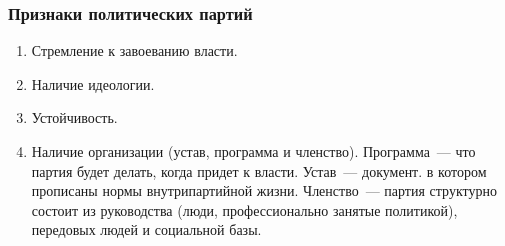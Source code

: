 \documentclass[12pt]{article}
\begin{document}
	\subsubsection{Признаки политических партий}
	\begin{enumerate}
		\item Стремление к завоеванию власти.
		\item Наличие идеологии.
		\item Устойчивость.
		\item Наличие организации (устав, программа и членство). Программа~--- что партия будет делать, когда придет к власти. Устав~--- документ. в котором прописаны нормы внутрипартийной жизни. Членство~--- партия структурно состоит из руководства (люди, профессионально занятые политикой), передовых людей и социальной базы.
	\end{enumerate}
\end{document}
